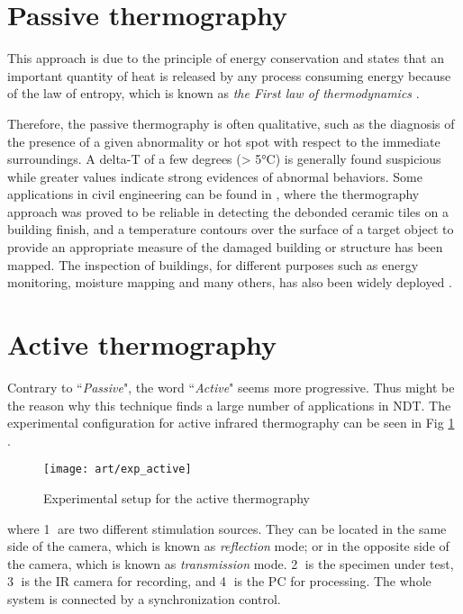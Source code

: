 \section{Passive thermography}
This approach is due to the principle of energy conservation and states that an important quantity of heat is released by any process consuming energy because of the law of entropy, which is known as \textit{the First law of thermodynamics} \citep{thdy1}. 

Therefore, the passive thermography is often qualitative, such as the diagnosis of the presence of a given abnormality or hot spot with respect to the immediate surroundings.  A delta-T of a few degrees (> 5°C) is generally
found suspicious while greater values indicate strong evidences of abnormal behaviors. Some applications in civil engineering can be found in \citep{2000-Li,stanley1994non,lo2004building}, where the thermography approach was proved to be reliable in detecting the debonded ceramic tiles on a building finish, and a temperature contours over the surface of a target object to provide an appropriate measure of the damaged building or structure has been mapped. The inspection of buildings, for different purposes such as energy monitoring, moisture mapping and many others, has also been widely deployed \citep{laranjeirapassive,bison1993automatic,bison2012geometrical}. 

\section{Active thermography}
Contrary to ``\textit{Passive}", the word ``\textit{Active}" seems more progressive. Thus might be the reason why this technique finds a large number of applications in NDT. The experimental configuration for active infrared thermography can be seen in Fig \ref{exp_active} \citep{sfarra2010comparative}. 
\begin{figure}[!htbp]
	\centering
	\texttt{[image: art/exp\_active]}
	\caption{Experimental setup for the active thermography}
	\label{exp_active}
\end{figure}
where \textcircled{\small 1} are two different stimulation sources. They can be located in the same side of the camera, which is known as \textit{reflection} mode; or in the opposite side of the camera, which is known as \textit{transmission} mode.  \textcircled{\small 2} is the specimen under test, \textcircled{\small 3} is the IR camera for recording, and \textcircled{\small 4} is the PC for processing. The whole system is connected by a synchronization control.

